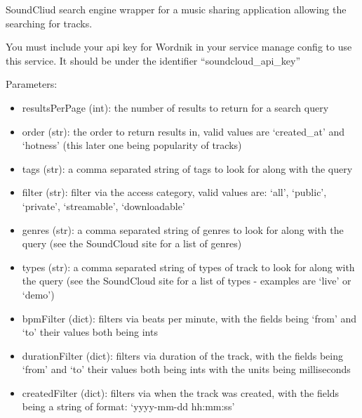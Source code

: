 \documentclass[letterpaper,10pt,english]{sphinxmanual}
\begin{document}
\begin{fulllineitems}
\label{api3.0:puppy.search.engine.SoundCloud}
SoundCliud search engine wrapper for a music sharing application allowing the searching for tracks.

You must include your api key for Wordnik in your service manage config to use this service. It should be under the identifier ``soundcloud\_api\_key''

Parameters:
\begin{itemize}
\item {} 
resultsPerPage (int): the number of results to return for a search query

\item {} 
order (str): the order to return results in, valid values are `created\_at' and `hotness' (this later one being popularity of tracks)

\item {} 
tags (str): a comma separated string of tags to look for along with the query

\item {} 
filter (str): filter via the access category, valid values are: `all', `public', `private', `streamable', `downloadable'

\item {} 
genres (str):  a comma separated string of genres to look for along with the query (see the SoundCloud site for a list of genres)

\item {} 
types (str): a comma separated string of types of track to look for along with the query (see the SoundCloud site for a list of types - examples are `live' or `demo')

\item {} 
bpmFilter (dict): filters via beats per minute, with the fields being `from' and `to' their values both being ints

\item {} 
durationFilter (dict): filters via duration of the track, with the fields being `from' and `to' their values both being ints with the units being milliseconds

\item {} 
createdFilter (dict): filters via when the track was created, with the fields being a string of format: `yyyy-mm-dd hh:mm:ss'

\end{itemize}

\end{fulllineitems}
\end{document}
